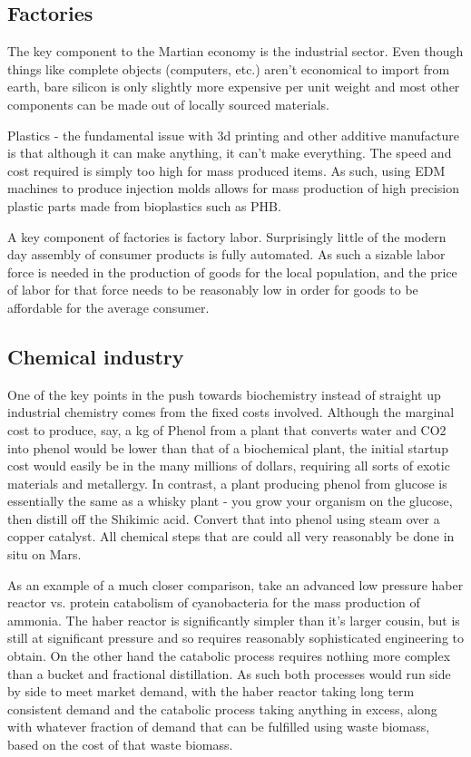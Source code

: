 \documentclass[10pt]{article}
\begin{document}
\subsection{Factories}
The key component to the Martian economy is the industrial sector. Even though things like complete objects (computers, etc.) aren't economical to import from earth, bare silicon is only slightly more expensive per unit weight and most other components can be made out of locally sourced materials. 

Plastics - the fundamental issue with 3d printing and other additive manufacture is that although it can make anything, it can't make everything. The speed and cost required is simply too high for mass produced items. As such, using EDM machines to produce injection molds allows for mass production of high precision plastic parts made from bioplastics such as PHB.

A key component of factories is factory labor. Surprisingly little of the modern day assembly of consumer products is fully automated. As such a sizable labor force is needed in the production of goods for the local population, and the price of labor for that force needs to be reasonably low in order for goods to be affordable for the average consumer.


\subsection*{Chemical industry}
One of the key points in the push towards biochemistry instead of straight up industrial chemistry comes from the fixed costs involved. Although the marginal cost to produce, say, a kg of Phenol from a plant that converts water and CO2 into phenol would be lower than that of a biochemical plant, the initial startup cost would easily be in the many millions of dollars, requiring all sorts of exotic materials and metallergy. In contrast, a plant producing phenol from glucose is essentially the same as a whisky plant - you grow your organism on the glucose, then distill off the Shikimic acid. Convert that into phenol using steam over a copper catalyst. All chemical steps that are could all very reasonably be done in situ on Mars.

As an example of a much closer comparison, take an advanced low pressure haber reactor vs. protein catabolism of cyanobacteria for the mass production of ammonia. The haber reactor is significantly simpler than it's larger cousin, but is still at significant pressure and so requires reasonably sophisticated engineering to obtain. On the other hand the catabolic process requires nothing more complex than a bucket and fractional distillation. As such both processes would run side by side to meet market demand, with the haber reactor taking long term consistent demand and the catabolic process taking anything in excess, along with whatever fraction of demand that can be fulfilled using waste biomass, based on the cost of that waste biomass.
\end{document}
